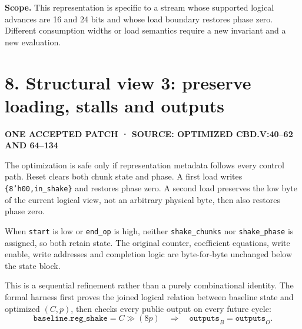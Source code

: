 \documentclass[10pt,a4paper]{article}
\newcommand{\smallcaps}[1]{\textcolor{Mid}{\fontsize{8.5}{10}\selectfont\bfseries\MakeUppercase{#1}}}
\newcommand{\newpageheading}[2]{\clearpage\section{#1}\smallcaps{#2}\vspace{6pt}}
\begin{document}
\begin{scopebox}
\textbf{Scope.} This representation is specific to a stream whose supported logical advances are 16 and 24 bits and whose load boundary restores phase zero. Different consumption widths or load semantics require a new invariant and a new evaluation.
\end{scopebox}

\newpageheading{8. Structural view 3: preserve loading, stalls and outputs}{One accepted patch · source: optimized cbd.v:40--62 and 64--134}

The optimization is safe only if representation metadata follows every control path. Reset clears both chunk state and phase. A first load writes \texttt{\{8'h00,in\_shake\}} and restores phase zero. A second load preserves the low byte of the current logical view, not an arbitrary physical byte, then also restores phase zero.

\begin{center}
\end{center}

When \texttt{start} is low or \texttt{end\_op} is high, neither \texttt{shake\_chunks} nor \texttt{shake\_phase} is assigned, so both retain state. The original counter, coefficient equations, write enable, write addresses and completion logic are byte-for-byte unchanged below the state block.

This is a sequential refinement rather than a purely combinational identity. The formal harness first proves the joined logical relation between baseline state and optimized $(C,p)$, then checks every public output on every future cycle:
\[
\texttt{baseline.reg\_shake}=C\gg(8p)
\quad\Longrightarrow\quad
\texttt{outputs}_{B}=\texttt{outputs}_{O}.
\]
\end{document}
